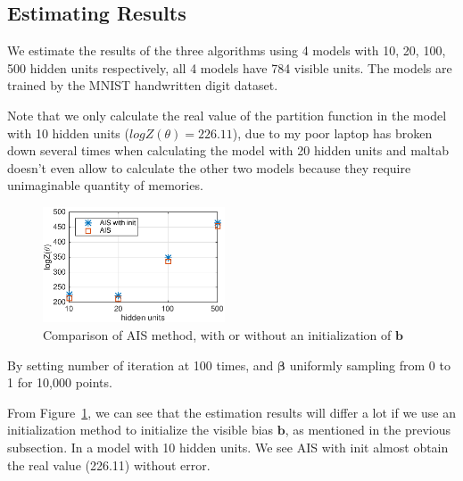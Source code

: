
\subsection{Estimating Results}

We estimate the results of the three algorithms using 4 models with 10, 20, 100, 500 hidden units respectively, all 4 models have 784 visible units. The models are trained by the MNIST handwritten digit dataset\cite{lecun1998mnist}.

Note that we only calculate the real value of the partition function in the model with 10 hidden units ($logZ(\theta)=226.11$), due to my poor laptop has broken down several times when calculating the model with 20 hidden units and maltab doesn't even allow to calculate the other two models because they require unimaginable quantity of memories.

\begin{figure}[t]
	\centering
	\includegraphics[width=0.48\textwidth]{figure/AIS_results/ais_result.eps}
	\caption{Comparison of AIS method, with or without an initialization of $\mathbf b$}
\label{fig:aisresult} %
\end{figure}
By setting number of iteration at 100 times, and $\mathbf \beta$ uniformly sampling from 0 to 1 for 10,000 points.

From Figure~\ref{fig:aisresult}, we can see that the estimation results will differ a lot if we use an initialization method to initialize the visible bias $\mathbf b$, as mentioned in the previous subsection. In a model with 10 hidden units. We see AIS with init almost obtain the real value (226.11) without error.




